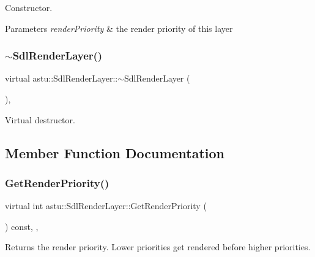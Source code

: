 Constructor.


\begin{DoxyParams}{Parameters}
{\em render\+Priority} & the render priority of this layer \\
\hline
\end{DoxyParams}
\mbox{\label{classastu_1_1SdlRenderLayer_adefbb130f5d9d21bd90b0022c4b9a11f}} 
\subsubsection{\texorpdfstring{$\sim$\+Sdl\+Render\+Layer()}{~SdlRenderLayer()}}
{\footnotesize\ttfamily virtual astu\+::\+Sdl\+Render\+Layer\+::$\sim$\+Sdl\+Render\+Layer (\begin{DoxyParamCaption}{ }\end{DoxyParamCaption})\hspace{0.3cm}{\ttfamily [inline]}, {\ttfamily [virtual]}}

Virtual destructor. 

\subsection{Member Function Documentation}
\mbox{\label{classastu_1_1SdlRenderLayer_ad7217b4bf8b8f0c9e801f72a44fe2f49}} 
\subsubsection{\texorpdfstring{Get\+Render\+Priority()}{GetRenderPriority()}}
{\footnotesize\ttfamily virtual int astu\+::\+Sdl\+Render\+Layer\+::\+Get\+Render\+Priority (\begin{DoxyParamCaption}{ }\end{DoxyParamCaption}) const\hspace{0.3cm}{\ttfamily [final]}, {\ttfamily [override]}, {\ttfamily [virtual]}}

Returns the render priority. Lower priorities get rendered before higher priorities.


